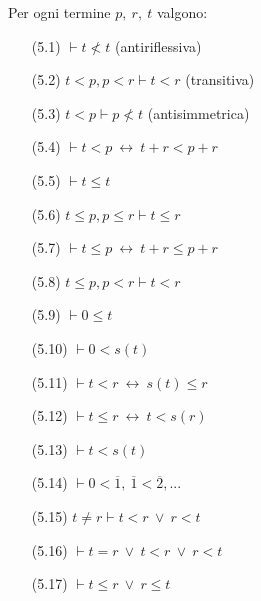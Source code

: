 \vspace{.5cm}
\begin{prop}
Per ogni termine $p,\ r,\ t$ valgono:
\vspace{.2cm}
\begin{enumerate}
	\item[(5.1)] $ \vdash t\not< t$ (antiriflessiva)
	\vspace{.2cm}
	\item[(5.2)] $t<p, p<r\vdash t<r$ (transitiva)
	\vspace{.2cm}
	\item[(5.3)] $t<p\vdash p\not< t$ (antisimmetrica)
	\vspace{.2cm}
	\item[(5.4)] $\vdash t<p\ \leftrightarrow\ t+r<p+r$
	\vspace{.2cm}
	\item[(5.5)] $\vdash t\leq t$
	\vspace{.2cm}
	\item[(5.6)] $t\leq p,p\leq r\vdash t\leq r$
	\vspace{.2cm}
	\item[(5.7)] $\vdash t\leq p\ \leftrightarrow\ t+r\leq p+r$
	\vspace{.2cm}
	\item[(5.8)] $t\leq p,p<r\vdash t<r$
	\vspace{.2cm}
	\item[(5.9)] $\vdash 0\leq t$
	\vspace{.2cm}
	\item[(5.10)] $\vdash 0<s(t)$
	\vspace{.2cm}
	\item[(5.11)] $\vdash t<r\ \leftrightarrow\ s(t)\leq r$
	\vspace{.2cm}
	\item[(5.12)] $\vdash t\leq r\ \leftrightarrow\ t<s(r)$
	\vspace{.2cm}
	\item[(5.13)] $\vdash t<s(t)$
	\vspace{.2cm}
	\item[(5.14)] $\vdash 0<\overline{1},\ \overline{1}<\overline{2},...$
	\vspace{.2cm}
	\item[(5.15)] $t\neq r\vdash t<r\ \vee\ r<t$
	\vspace{.2cm}
	\item[(5.16)] $\vdash t=r\ \vee\ t<r\ \vee\ r<t$
	\vspace{.2cm}
	\item[(5.17)] $\vdash t\leq r\ \vee\ r\leq t$

\end{enumerate}
\end{prop}
